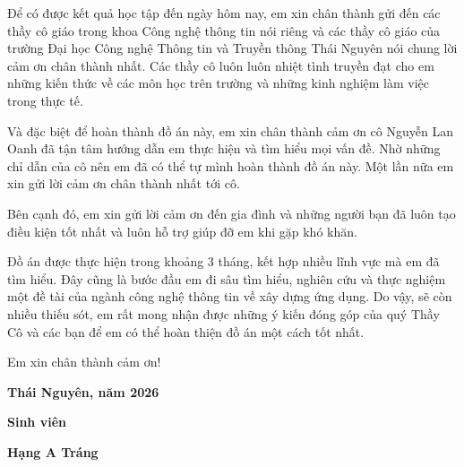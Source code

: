 


Để có được kết quả học tập đến ngày hôm nay, em xin chân thành gửi đến các thầy cô giáo trong khoa Công nghệ thông tin nói riêng và các thầy cô giáo của trường Đại học Công nghệ Thông tin và Truyền thông Thái Nguyên nói chung lời cảm ơn chân thành nhất. Các thầy cô luôn luôn nhiệt tình truyền đạt cho em những kiến thức về các môn học trên trường và những kinh nghiệm làm việc trong thực tế.


Và đặc biệt để hoàn thành đồ án này, em xin chân thành cảm ơn cô Nguyễn Lan Oanh đã tận tâm hướng dẫn em thực hiện và tìm hiểu mọi vấn đề. Nhờ những chỉ dẫn của cô nên em đã có thể tự mình hoàn thành đồ án này. Một lần nữa em xin gửi lời cảm ơn chân thành nhất tới cô.


Bên cạnh đó, em xin gửi lời cảm ơn đến gia đình và những người bạn đã luôn tạo điều kiện tốt nhất và luôn hỗ trợ giúp đỡ em khi gặp khó khăn.


Đồ án được thực hiện trong khoảng 3 tháng, kết hợp nhiều lĩnh vực mà em đã tìm hiểu. Đây cũng là bước đầu em đi sâu tìm hiểu, nghiên cứu và thực nghiệm một đề tài của ngành công nghệ thông tin về xây dựng ứng dụng. Do vậy, sẽ còn nhiều thiếu sót, em rất mong nhận được những ý kiến đóng góp của quý Thầy Cô và các bạn để em có thể hoàn thiện đồ án một cách tốt nhất.


Em xin chân thành cảm ơn!


\vspace{1.2cm}

\hfill
\begin{minipage}{7cm}
	\centering
	
	\textbf{Thái Nguyên, năm 2026}
	
	\vspace{0.7cm}
	
	\textbf{Sinh viên}
	
	\vspace{2.8cm}
	
	\textbf{Hạng A Tráng}
	
\end{minipage}

